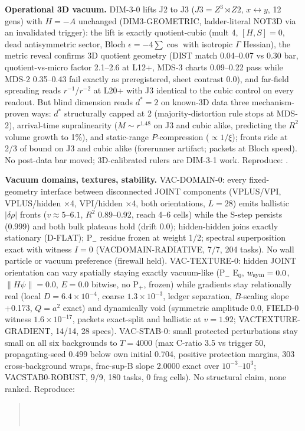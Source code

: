 \documentclass[11pt]{article}
\begin{document}
\textbf{Operational 3D vacuum.} DIM-3-0 lifts J2 to J3
($J3 = Z^3 \rtimes Z2$, $x{\leftrightarrow}y$, 12 gens) with $H = -A$
unchanged (DIM3-GEOMETRIC, ladder-literal NOT3D via an invalidated
trigger): the lift is exactly quotient-cubic (mult 4, $[H,S] = 0$,
dead antisymmetric sector, Bloch $\epsilon = -4\sum\cos$ with
isotropic $\Gamma$ Hessian), the metric reveal confirms 3D quotient
geometry (DIST match 0.04--0.07 vs 0.30 bar, quotient-vs-micro factor
2.1--2.6 at L12+, MDS-3 charts 0.09--0.22 pass while MDS-2 0.35--0.43
fail exactly as preregistered, sheet contrast 0.0), and far-field
spreading reads $r^{-1}$/$r^{-2}$ at L20+ with J3 identical to the
cubic control on every readout. But blind dimension reads $d^* = 2$ on
known-3D data three mechanism-proven ways: $d^*$ structurally capped
at 2 (majority-distortion rule stops at MDS-2), arrival-time
supralinearity ($M \sim r^{1.48}$ on J3 and cubic alike, predicting
the $R^2$ volume growth to 1\%), and static-range $P$-compression
($\propto 1/\xi$); fronts ride at 2/3 of bound on J3 and cubic alike
(forerunner artifact; packets at Bloch speed). No post-data bar moved;
3D-calibrated rulers are DIM-3-1 work.
Reproduce: .

\textbf{Vacuum domains, textures, stability.} VAC-DOMAIN-0: every
fixed-geometry interface between disconnected JOINT components (VPLUS/VPI,
VPLUS/hidden $\times$4, VPI/hidden $\times$4, both orientations, $L = 28$)
emits ballistic $|\delta\rho|$ fronts ($v \approx 5$--$6.1$, $R^2$
0.89--0.92, reach 4--6 cells) while the S-step persists (0.999) and both
bulk plateaus hold (drift 0.0); hidden-hidden joins exactly stationary
(D-FLAT); P$_-$ residue frozen at weight 1/2; spectral superposition exact
with witness $I = 0$ (VACDOMAIN-RADIATIVE, 7/7, 204 tasks). No wall
particle or vacuum preference (firewall held). VAC-TEXTURE-0: hidden JOINT
orientation can vary spatially staying exactly vacuum-like (P$_-$ E$_0$,
$w_{\rm sym} = 0.0$, $\|H\psi\| = 0.0$, $E = 0.0$ bitwise, no P$_+$, frozen)
while gradients stay relationally real (local $D = 6.4\times10^{-4}$,
coarse $1.3\times10^{-3}$, ledger separation, $B$-scaling slope +0.173,
$Q = a^2$ exact) and dynamically void (symmetric amplitude 0.0, FIELD-0
witness $1.6\times10^{-17}$, packets exact-split and ballistic at
$v = 1.92$; VACTEXTURE-GRADIENT, 14/14, 28 specs). VAC-STAB-0: small
protected perturbations stay small on all six backgrounds to $T = 4000$
(max C-ratio 3.5 vs trigger 50, propagating-seed 0.499 below own initial
0.704, positive protection margins, 303 cross-background wraps, frac-sup-B
slope 2.0000 exact over $10^{-3}$--$10^3$; VACSTAB0-ROBUST, 9/9, 180
tasks, 0 frag cells). No structural claim, none ranked.
Reproduce:
\begin{quote}\small
{}\\
\\
\end{quote}
\end{document}
